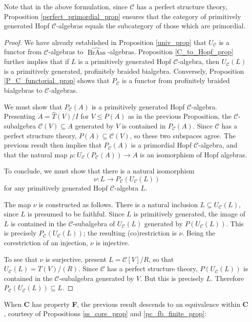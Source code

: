 \documentclass[12pt]{article}
\DeclareMathOperator{\BrAss}{BrAss}
\newcommand{\BrAsshat}{\widehat{\BrAss}} %
\newcommand{\That}{\widehat{T}}
\newcommand{\CC} {\mathcal{C}}
\newcommand{\bC} {\mathbf{C}}
\theoremstyle{plain}
\theoremstyle{definition}
\theoremstyle{remark}
\begin{document}
Note that in the above formulation, since $\CC$ has a perfect structure theory, Proposition \ref{perfect_primordial_prop} ensures that the category of primitively generated Hopf $\CC$-algebras equals the subcategory of those which are primordial.

\begin{proof}

We have already established in Proposition \ref{univ_prop} that $U_{\CC}$ is a functor from $\CC$-algebras to $\BrAsshat$-algebras.  Proposition \ref{C_to_Hopf_prop} further implies that if $L$ is a primitively generated Hopf $\CC$-algebra, then $U_{\CC}(L)$ is a primitively generated, profinitely braided bialgebra.  Conversely, Proposition \ref{P_C_functorial_prop} shows that $P_{\CC}$ is a functor from profinitely braided bialgebras to $\CC$-algebras.  

We must show that $P_{\CC}(A)$ is a primitively generated Hopf $\CC$-algebra.  Presenting $A = \That(V)/I$ for $V \leq P(A)$ as in the previous Proposition, the $\CC$-subalgebra $\CC(V) \subseteq A$ generated by $V$ is contained in $P_{\CC}(A)$.  Since $\CC$ has a perfect structure theory, $P(A) \subseteq \CC(V)$, so these two subspaces agree.  The previous result then implies that $P_{\CC}(A)$ is a primordial Hopf $\CC$-algebra, and that the natural map $\mu: U_{\CC}(P_{\CC}(A)) \to A$ is an isomorphism of Hopf algebras.

To conclude, we must show that there is a natural isomorphism
%
$$\nu: L \to P_{\CC}(U_{\CC}(L))$$
%
for any primitively generated Hopf $\CC$-algebra $L$. 

The map $\nu$ is constructed as follows.  There is a natural inclusion $L \subseteq U_{\CC}(L)$, since $L$ is presumed to be faithful.  Since $L$ is primitively generated, the image of $L$ is contained in the $\CC$-subalgebra of $U_{\CC}(L)$ generated by $P(U_{\CC}(L))$.  This is precisely $P_{\CC}(U_{\CC}(L))$; the resulting (co)restriction is $\nu$.  Being the corestriction of an injection, $\nu$ is injective.

To see that $\nu$ is surjective, present $L = \CC[V]/R$, so that $U_{\CC}(L) = T(V)/(R)$.  Since $\CC$ has a perfect structure theory, $P(U_{\CC}(L))$ is contained in the $\CC$-subalgebra generated by $V$.  But this is precisely $L$.  Therefore $P_{\CC}(U_{\CC}(L)) \subseteq L$.

\end{proof}

When $\bC$ has property {\bf F}, the previous result descends to an equivalence within $\bC$, courtesy of Propositions \ref{ss_core_prop} and \ref{pc_fb_finite_prop}:
\end{document}
